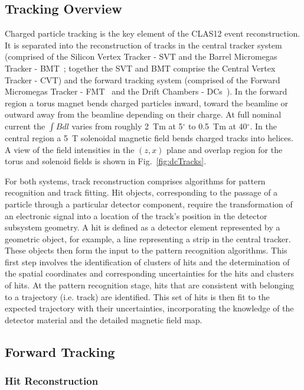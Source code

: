 \subsection{Tracking Overview}

Charged particle tracking is the key element of the CLAS12 event reconstruction. It is separated into the
reconstruction of tracks in the central tracker system (comprised of the Silicon Vertex Tracker - SVT
\cite{svt-nim} and the Barrel Micromegas Tracker - BMT~\cite{mm-nim}; together the SVT and BMT comprise
the Central Vertex Tracker - CVT)  and the forward tracking system (comprised of the Forward Micromegas
Tracker - FMT~\cite{mm-nim} and the Drift Chambers - DCs~\cite{dc-nim}). In the forward region a torus magnet bends charged particles inward, toward
the beamline or outward away from the beamline depending on their charge. At full nominal current the $\int B dl$
varies from roughly 2~Tm at 5$^\circ$ to 0.5~Tm at 40$^\circ$. In the central region a 5~T solenoidal magnetic
field bends charged tracks into helices. A view of the field intensities in the $(z,x)$ plane and overlap region for
the torus and solenoid fields is shown in Fig.~\ref{fig:dcTracks}.

For both systems, track reconstruction comprises algorithms for pattern recognition and track fitting. 
Hit objects, corresponding to the passage of a particle through a particular detector component, 
require the transformation of an electronic signal into a location of the track's position in the 
detector subsystem geometry. A hit is defined as a detector element represented by a 
geometric object, for example, a line representing a strip in the central tracker. 
These objects then form the input to the pattern recognition
algorithms. This first step involves the identification of clusters of hits and the determination of the spatial
coordinates and corresponding uncertainties for the hits and clusters of hits. At the pattern recognition stage, hits
that are consistent with belonging to a trajectory (i.e. track) are identified. This set of hits is then fit to the
expected trajectory with their uncertainties, incorporating the knowledge of the detector material and the
detailed magnetic field map.

\subsection{Forward Tracking}

\subsubsection{Hit Reconstruction}
\label{sec:hitrecon}

